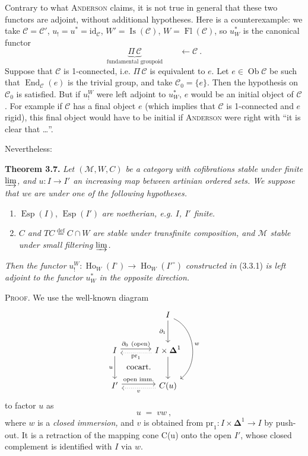 \documentclass[11pt]{article}
\newcommand{\printedpage}[1]{\marginpar{\footnotesize p.~#1}}
\newcommand{\msp}[1]{\marginpar{\footnotesize [#1]}}
\newcommand{\Esp}{\operatorname{Esp}}
\newcommand{\Fl}{\operatorname{Fl}}
\newcommand{\Ob}{\operatorname{Ob}}
\newcommand{\Ho}{\operatorname{Ho}}
\newcommand{\id}{\mathrm{id}}
\newcommand{\pr}{\mathrm{pr}}
\newcommand{\M}{\mathcal{M}}
\begin{document}
\msp{page 59}
Contrary to what \textsc{Anderson} claims, it is not true in general that these two %
functors are adjoint, without additional hypotheses. Here is a counterexample: we take $\mathcal{C} = \mathcal{C}'$, $u_! = u^* = \id_{\mathcal{C}}$, $W' = \operatorname{Is}(\mathcal{C})$, $W = \Fl(\mathcal{C})$, so $u_W^*$ is the canonical functor
\[
\underbrace{\Pi\,\mathcal{C}}_{\text{fundamental groupoid}} \qquad \longleftarrow \mathcal{C}\ .
\]
Suppose that $\mathcal{C}$ is 1-connected, i.e. $\Pi\,\mathcal{C}$ is equivalent to $e$. Let $e\in\Ob\mathcal{C}$ be such that $\operatorname{End}_{\mathcal{C}}(e)$ is the trivial group, and take $\mathcal{C}_0 = \{e\}$. Then the hypothesis on $\mathcal{C}_0$ is satisfied. But if $u_!^W$ were left adjoint to $u_W^*$, $e$ would be an initial object of $\mathcal{C}$. For example if $\mathcal{C}$ has a final object $e$ (which implies that $\mathcal{C}$ is 1-connected and $e$ rigid), this final object would have to be initial if \textsc{Anderson} were right with ``it is clear that \ldots''.

\msp{page 60}
Nevertheless:

\textbf{Theorem 3.7.} \textit{Let $(\M,W,C)$ be a category with cofibrations stable under finite $\varinjlim$, and $u : I \longrightarrow I'$ an increasing map between artinian ordered sets. We suppose that we are under one of the following hypotheses.}
\begin{enumerate}
\item[a)] $\Esp(I)$, $\Esp(I')$ \textit{are noetherian, e.g. $I$, $I'$ finite.}

\printedpage{30}
\item[b)] \textit{$C$ and $TC \overset{\text{def}}{=} C\cap W$ are stable under transfinite composition, and $\M$ stable under small filtering $\varinjlim$.}
\end{enumerate}
\textit{Then the functor} $u_!^W : \Ho_W(I^\circ) \longrightarrow \Ho_W(I'^\circ)$ \textit{constructed in} (3.3.1) \textit{is left adjoint to the functor $u_W^*$ in the opposite direction.}

\textsc{Proof.} We use the well-known diagram
\[
\begin{tikzcd}[row sep=large, column sep=large]
 & I \arrow[d, "\partial_1"'] \arrow[dd, bend left=60, "w"] \\
I \arrow[r, shift left, "\partial_0\ (\text{open})"] \arrow[d, "u"'] \arrow[dr, phantom, "\text{cocart.}"] & I\times\boldsymbol{\Delta}^1 \arrow[l, dotted, shift left, "\pr_1"] \arrow[d] \\
I' \arrow[r, shift left, "\text{open imm.}"] & C(u) \arrow[l, dotted, shift left, "v"]
\end{tikzcd}
\]
to factor $u$ as
\[
u \;=\; vw\ ,
\]
where $w$ is a \textit{closed immersion,} and $v$ is obtained from $\pr_1 : I\times\boldsymbol{\Delta}^1 \longrightarrow I$ by push-out. It is a retraction of the mapping cone C(u) onto the open $I'$, whose closed complement is identified with $I$ via $w$.
\end{document}
